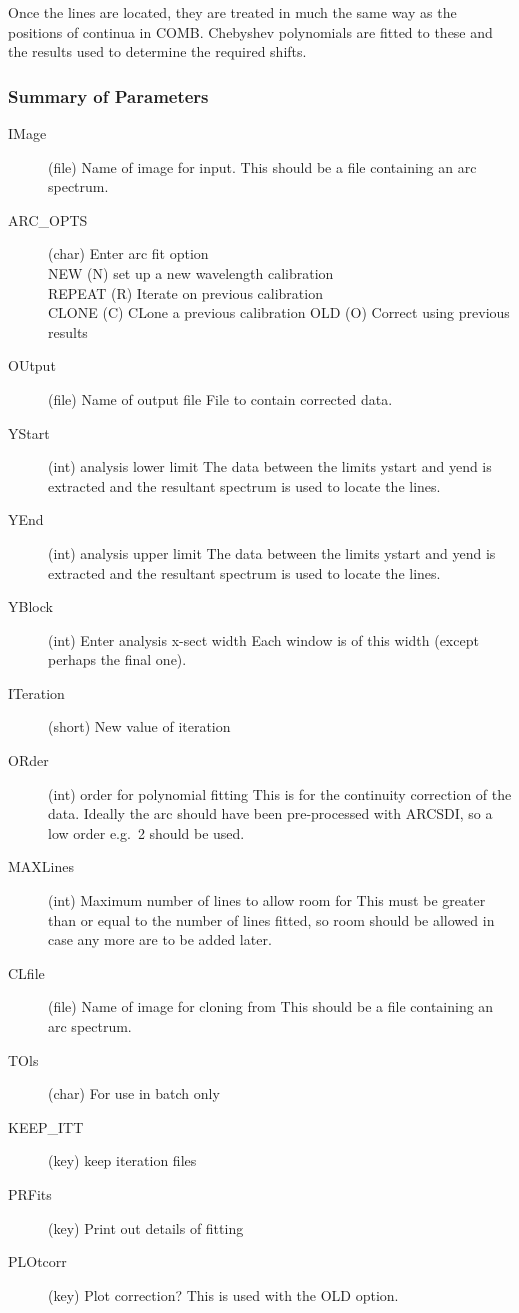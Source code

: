 Once the lines are located, they are treated in much the same way as
the positions of continua in COMB. Chebyshev polynomials are fitted to
these and the results used to determine the required shifts.

\subsubsection{Summary of Parameters}
\begin{description}
\item[IMage] (file) Name of image for input. This should be a file
containing an arc spectrum.
\item[ARC\_OPTS] (char) Enter arc fit option\\
NEW    (N) set up a new wavelength calibration\\
REPEAT (R) Iterate on previous calibration\\
CLONE  (C) CLone a previous calibration
OLD    (O) Correct using previous results
\item[OUtput] (file) Name of output file
File to contain corrected data.
\item[YStart] (int) analysis lower limit
The data between the limits ystart and yend is extracted
and the resultant spectrum is used to locate the lines.
\item[YEnd] (int) analysis upper limit
The data between the limits ystart and yend is extracted
and the resultant spectrum is used to locate the lines.
\item[YBlock] (int) Enter analysis x-sect width
Each window is of this width (except perhaps the final one).
\item[ITeration] (short) New value of iteration
\item[ORder] (int) order for polynomial fitting
This is for the continuity correction of the data. Ideally the
arc should have been pre-processed with ARCSDI, so a low
order e.g.\ 2 should be used.
\item[MAXLines] (int) Maximum number of lines to allow room for
This must be greater than or equal to the number of lines
fitted, so room should be allowed in case any more are
to be added later.
\item[CLfile] (file) Name of image for cloning from
This should be a file containing an arc spectrum.
\item[TOls] (char) For use in batch only
\item[KEEP\_ITT] (key) keep iteration files
\item[PRFits] (key) Print out details of fitting
\item[PLOtcorr] (key) Plot correction?
This is used with the OLD option.
\end{description}

